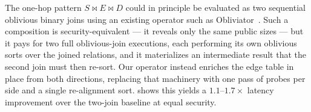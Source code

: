 The one-hop pattern $S \bowtie E \bowtie D$ could in principle be evaluated as two
sequential oblivious binary joins using an existing operator such as
Obliviator~\cite{mavrogiannakis2025obliviator}. Such a composition is
security-equivalent --- it reveals only the same public sizes --- but it pays for
two full oblivious-join executions, each performing its own oblivious sorts over
the joined relations, and it materializes an intermediate result that the second
join must then re-sort. Our operator instead enriches the edge table in place from
both directions, replacing that machinery with one pass of probes per side and a
single re-alignment sort.  shows this yields a
$1.1$--$1.7\times$ latency improvement over the two-join baseline at equal
security.


